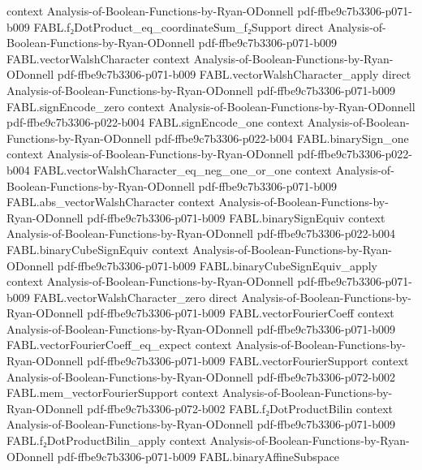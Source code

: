 \begin{theorem}
  {context}
  {Analysis-of-Boolean-Functions-by-Ryan-ODonnell}
  {pdf-ffbe9c7b3306-p071-b009}
\proofstep
  {FABL.f₂DotProduct_eq_coordinateSum_f₂Support}
  {direct}
  {Analysis-of-Boolean-Functions-by-Ryan-ODonnell}
  {pdf-ffbe9c7b3306-p071-b009}
\proofstep
  {FABL.vectorWalshCharacter}
  {context}
  {Analysis-of-Boolean-Functions-by-Ryan-ODonnell}
  {pdf-ffbe9c7b3306-p071-b009}
\proofstep
  {FABL.vectorWalshCharacter_apply}
  {direct}
  {Analysis-of-Boolean-Functions-by-Ryan-ODonnell}
  {pdf-ffbe9c7b3306-p071-b009}
\proofstep
  {FABL.signEncode_zero}
  {context}
  {Analysis-of-Boolean-Functions-by-Ryan-ODonnell}
  {pdf-ffbe9c7b3306-p022-b004}
\proofstep
  {FABL.signEncode_one}
  {context}
  {Analysis-of-Boolean-Functions-by-Ryan-ODonnell}
  {pdf-ffbe9c7b3306-p022-b004}
\proofstep
  {FABL.binarySign_one}
  {context}
  {Analysis-of-Boolean-Functions-by-Ryan-ODonnell}
  {pdf-ffbe9c7b3306-p022-b004}
\proofstep
  {FABL.vectorWalshCharacter_eq_neg_one_or_one}
  {context}
  {Analysis-of-Boolean-Functions-by-Ryan-ODonnell}
  {pdf-ffbe9c7b3306-p071-b009}
\proofstep
  {FABL.abs_vectorWalshCharacter}
  {context}
  {Analysis-of-Boolean-Functions-by-Ryan-ODonnell}
  {pdf-ffbe9c7b3306-p071-b009}
\proofstep
  {FABL.binarySignEquiv}
  {context}
  {Analysis-of-Boolean-Functions-by-Ryan-ODonnell}
  {pdf-ffbe9c7b3306-p022-b004}
\proofstep
  {FABL.binaryCubeSignEquiv}
  {context}
  {Analysis-of-Boolean-Functions-by-Ryan-ODonnell}
  {pdf-ffbe9c7b3306-p071-b009}
\proofstep
  {FABL.binaryCubeSignEquiv_apply}
  {context}
  {Analysis-of-Boolean-Functions-by-Ryan-ODonnell}
  {pdf-ffbe9c7b3306-p071-b009}
\proofstep
  {FABL.vectorWalshCharacter_zero}
  {direct}
  {Analysis-of-Boolean-Functions-by-Ryan-ODonnell}
  {pdf-ffbe9c7b3306-p071-b009}
\proofstep
  {FABL.vectorFourierCoeff}
  {context}
  {Analysis-of-Boolean-Functions-by-Ryan-ODonnell}
  {pdf-ffbe9c7b3306-p071-b009}
\proofstep
  {FABL.vectorFourierCoeff_eq_expect}
  {context}
  {Analysis-of-Boolean-Functions-by-Ryan-ODonnell}
  {pdf-ffbe9c7b3306-p071-b009}
\proofstep
  {FABL.vectorFourierSupport}
  {context}
  {Analysis-of-Boolean-Functions-by-Ryan-ODonnell}
  {pdf-ffbe9c7b3306-p072-b002}
\proofstep
  {FABL.mem_vectorFourierSupport}
  {context}
  {Analysis-of-Boolean-Functions-by-Ryan-ODonnell}
  {pdf-ffbe9c7b3306-p072-b002}
\proofstep
  {FABL.f₂DotProductBilin}
  {context}
  {Analysis-of-Boolean-Functions-by-Ryan-ODonnell}
  {pdf-ffbe9c7b3306-p071-b009}
\proofstep
  {FABL.f₂DotProductBilin_apply}
  {context}
  {Analysis-of-Boolean-Functions-by-Ryan-ODonnell}
  {pdf-ffbe9c7b3306-p071-b009}
\proofstep
  {FABL.binaryAffineSubspace}

\end{theorem}
